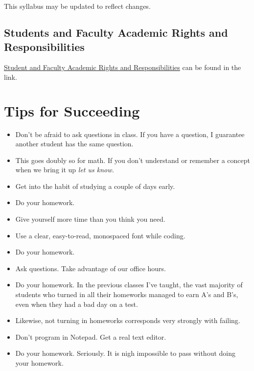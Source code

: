 \documentclass[10pt, letter]{article}
\begin{document}
This syllabus may be updated to reflect changes.


\subsection*{Students and Faculty Academic Rights and Responsibilities}
\href{http://policies.temple.edu/PDF/99.pdf}{Student and Faculty Academic Rights and Responsibilities} can be found in the link.


\section*{Tips for Succeeding}
\begin{itemize}
	\item Don't be afraid to ask questions in class.  If you have a question, I guarantee another student has the same question.  
	\item This goes doubly so for math.  If you don't understand or remember a concept when we bring it up \emph{let us know.}
	\item Get into the habit of studying a couple of days early.
	\item Do your homework.
	\item Give yourself more time than you think you need.
	\item Use a clear, easy-to-read, monospaced font while coding.
	\item Do your homework.
	\item Ask questions.  Take advantage of our office hours.
	\item Do your homework.  In the previous classes I've taught, the vast majority of students who turned in all their homeworks managed to earn A's and B's, even when they had a bad day on a test.
	\item Likewise, not turning in homeworks corresponds very strongly with failing.
	\item Don't program in Notepad.  Get a real text editor.
	\item Do your homework. Seriously.  It is nigh impossible to pass without doing your homework.
	
	
\end{itemize}
\end{document}

